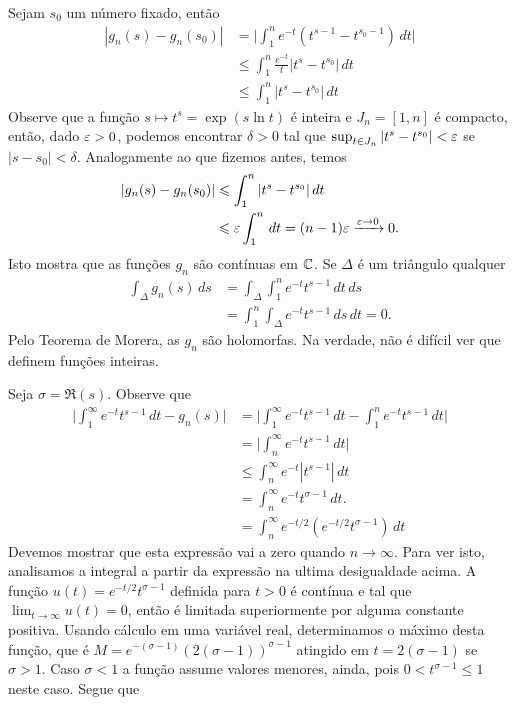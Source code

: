     Sejam $s_0$ um número fixado, então
    \begin{align*}
        |g_n(s) - g_n(s_0)| &= \Big | \int_{1}^{n}e^{-t}(t^{s-1}-t^{s_0-1}) \, dt\Big | \\
        &\leq \int_{1}^{n}\frac{e^{-t}}{t}|t^{s}-t^{s_0}| \, dt \\
        &\leq \int_{1}^{n}|t^{s}-t^{s_0}| \, dt 
    \end{align*}
    Observe que a função $s \mapsto t^s = \exp(s\ln t)$ é inteira e $J_n = [1,n]$ é compacto, então, dado $\varepsilon > 0$, podemos encontrar $\delta > 0$ tal que $\sup_{t \in J_n}|t^{s}-t^{s_0}| < \varepsilon$ se $|s-s_0| < \delta$. Analogamente ao que fizemos antes, temos 
    \begin{align*}
    |g_n(s) - g_n(s_0)| &\leqslant \int_{1}^{n}|t^{s}-t^{s_0}| \, dt \\
    &\leqslant \varepsilon \int_{1}^{n} \, dt = (n-1)\varepsilon \xrightarrow{\varepsilon \to 0} 0.
    \end{align*}
    Isto mostra que as funções $g_n$ são contínuas em $\mathbb{C}$. Se $\Delta$ é um triângulo qualquer
    \begin{align*}
        \int_\Delta g_n(s) \, ds &= \int_\Delta\int_{1}^{n}e^{-t}t^{s-1} \, dt \, ds \\
        &= \int_{1}^{n}\int_\Delta e^{-t}t^{s-1} \, ds \, dt = 0.
    \end{align*}
    Pelo Teorema de Morera, as $g_n$ são holomorfas. Na verdade, não é difícil ver que definem funções inteiras. 
    
    Seja $\sigma = \Re(s)$. Observe que 
    \begin{align*}
        \Big | \int_{1}^{\infty}e^{-t}t^{s-1} \, dt - g_n(s) \Big | &= \Big | \int_{1}^{\infty}e^{-t}t^{s-1} \, dt - \int_{1}^{n}e^{-t}t^{s-1} \, dt \Big | \\
        &= \Big | \int_{n}^{\infty}e^{-t}t^{s-1} \, dt \Big | \\
        &\leq \int_{n}^{\infty}e^{-t}|t^{s-1}| \, dt \\
        &= \int_{n}^{\infty}e^{-t}t^{\sigma-1} \, dt.\\
        &= \int_{n}^{\infty}e^{-t/2}(e^{-t/2}t^{\sigma-1}) \, dt
    \end{align*}
    Devemos mostrar que esta expressão vai a zero quando $n \to \infty$. Para ver isto, analisamos a integral a partir da expressão na ultima desigualdade acima. A função $u(t) = e^{-t/2}t^{\sigma-1}$ definida para $t > 0$ é contínua e tal que $\lim_{t \to \infty} u(t) = 0$, então é limitada superiormente por alguma constante positiva. Usando cálculo em uma variável real, determinamos o máximo desta função, que é $M = e^{-(\sigma -1)}(2(\sigma -1))^{\sigma-1}$ atingido em $t = 2(\sigma-1)$ se $\sigma > 1$. Caso $\sigma < 1$ a função assume valores menores, ainda, pois $0 < t^{\sigma-1} \leq 1$ neste caso. Segue que
    
